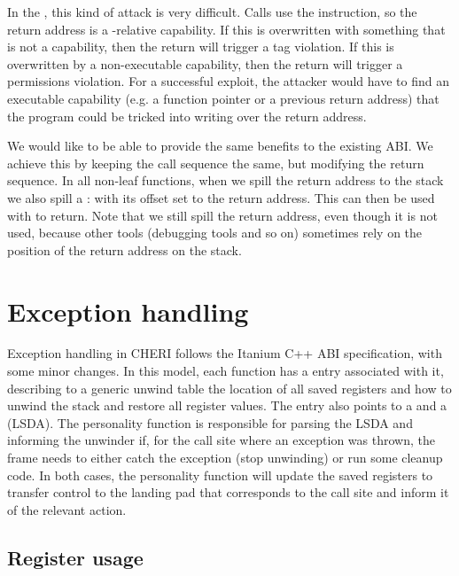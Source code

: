 In the \sandboxABI{}, this kind of attack is very difficult.
Calls use the  instruction, so the return address is a -relative capability.
If this is overwritten with something that is not a capability, then the return will trigger a tag violation.
If this is overwritten by a non-executable capability, then the return will trigger a permissions violation.
For a successful exploit, the attacker would have to find an executable capability (e.g. a function pointer or a previous return address) that the program could be tricked into writing over the return address.

We would like to be able to provide the same benefits to the existing ABI.
We achieve this by keeping the call sequence the same, but modifying the return sequence.
In all non-leaf functions, when we spill the return address to the stack we also spill a :  with its offset set to the return address.
This can then be used with  to return.
Note that we still spill the return address, even though it is not used, because other tools (debugging tools and so on) sometimes rely on the position of the return address on the stack.


\section{Exception handling}

Exception handling in CHERI follows the Itanium C++ ABI specification, with some minor changes.
In this model, each function has a  entry associated with it, describing to a generic unwind table the location of all saved registers and how to unwind the stack and restore all register values.
The  entry also points to a  and a  (LSDA).
The personality function is responsible for parsing the LSDA and informing the unwinder if, for the call site where an exception was thrown, the frame needs to either catch the exception (stop unwinding) or run some cleanup code.
In both cases, the personality function will update the saved registers to transfer control to the landing pad that corresponds to the call site and inform it of the relevant action.

\subsection{Register usage}

